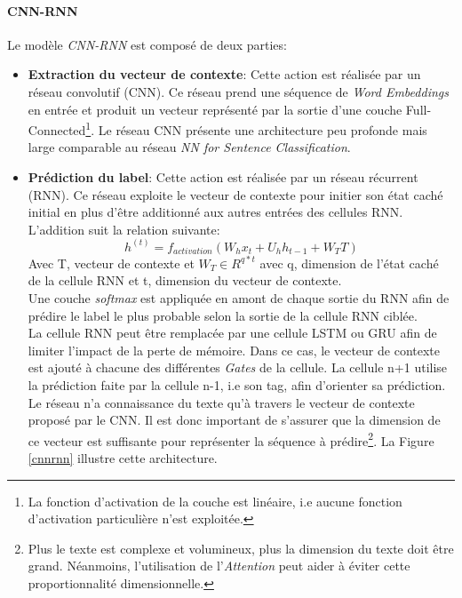 \paragraph{CNN-RNN}
\noindent Le modèle \textit{CNN-RNN}\cite{cnnlstm} est composé de deux parties:
\begin{itemize}
    \item \textbf{Extraction du vecteur de contexte}: Cette action est réalisée par un réseau convolutif (CNN). Ce réseau prend une séquence de \textit{Word Embeddings} en entrée et produit un vecteur représenté par la sortie d'une couche Full-Connected\footnote{La fonction d'activation de la couche est linéaire, i.e aucune fonction d'activation particulière n'est exploitée.}. Le réseau CNN présente une architecture peu profonde mais large comparable au réseau \textit{NN for Sentence Classification}.

    \item \textbf{Prédiction du label}: Cette action est réalisée par un réseau récurrent (RNN). Ce réseau exploite le vecteur de contexte pour initier son état caché initial en plus d'être additionné aux autres entrées des cellules RNN. L'addition suit la relation suivante:
    $$h^{(t)}=f_{activation}(W_hx_t+U_hh_{t-1}+W_TT)$$
    \noindent Avec T, vecteur de contexte et $W_T \in R^{q*t}$ avec q, dimension de l'état caché de la cellule RNN et t, dimension du vecteur de contexte.\\

    Une couche \textit{softmax} est appliquée en amont de chaque sortie du RNN afin de prédire le label le plus probable selon la sortie de la cellule RNN ciblée.\\

    La cellule RNN peut être remplacée par une cellule LSTM ou GRU afin de limiter l'impact de la perte de mémoire. Dans ce cas, le vecteur de contexte est ajouté à chacune des différentes \textit{Gates} de la cellule. La cellule n+1 utilise la prédiction faite par la cellule n-1, i.e son tag, afin d'orienter sa prédiction. Le réseau n'a connaissance du texte qu'à travers le vecteur de contexte proposé par le CNN. Il est donc important de s'assurer que la dimension de ce vecteur est suffisante pour représenter la séquence à prédire\footnote{Plus le texte est complexe et volumineux, plus la dimension du texte doit être grand. Néanmoins, l'utilisation de l'\textit{Attention} peut aider à éviter cette proportionnalité dimensionnelle.}. La Figure \ref{cnnrnn} illustre cette architecture.

\end{itemize}

